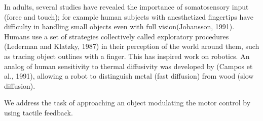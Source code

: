 In adults, several studies have revealed the importance of
somatosensory input (force and touch); for example human subjects
with anesthetized fingertips have difficulty in handling small
objects even with full vision(Johansson, 1991). Humans use a set
of strategies collectively called exploratory procedures (Lederman
and Klatzky, 1987) in their perception of the world around them,
such as tracing object outlines with a finger. This has inspired
work on robotics. An analog of human sensitivity to thermal
diffusivity was developed by (Campos et al., 1991), allowing a
robot to distinguish metal (fast diffusion) from wood (slow
diffusion).


We address the task of approaching an object modulating the motor
control by using tactile feedback.
